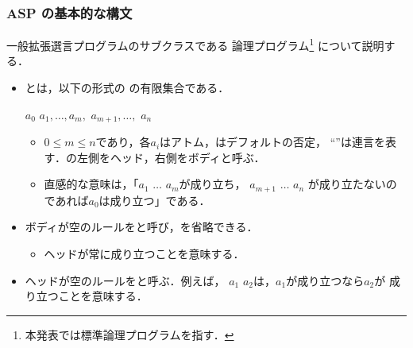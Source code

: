 \documentclass[dvipdfmx,11pt]{beamer}
\begin{document}
\begin{frame}\frametitle{ASP の基本的な構文}

  一般拡張選言プログラムのサブクラスである
  論理プログラム\footnote{本発表では標準論理プログラムを指す．}
  について説明する．

  \begin{itemize}
    \item {}とは，以下の形式の
          の有限集合である．
          \begin{block}{}
            \centering
            $a_0$ \code{:-} $a_1, \dots, a_m,$  
            $a_{m+1}, \dots,$  $a_{n}$
          \end{block}
          \begin{itemize}
            \item $0 \le m \le n$であり，各$a_i$はアトム，はデフォルトの否定，
                  ``\code{,}''は連言を表す．\code{:-}の左側をヘッド，右側をボディと呼ぶ．
            \item 直感的な意味は，「$a_1$ \code{,} $\dots$ \code{,} $a_m$が成り立ち，
                  $a_{m+1}$ \code{,} $\dots$ \code{,} $a_{n}$
                  が成り立たないのであれば$a_{0}$は成り立つ」である．
          \end{itemize}       
    \item ボディが空のルールをと呼び，\code{:-}を省略できる．
          \begin{itemize}
            \item ヘッドが常に成り立つことを意味する．
          \end{itemize}
    \item ヘッドが空のルールをと呼ぶ．例えば，
          \code{:-} $a_1$  $a_2$は，$a_1$が成り立つなら$a_2$が
          成り立つことを意味する．
  \end{itemize}
  
\end{frame}
\end{document}
